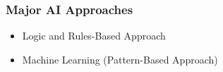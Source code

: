 



\begin{frame}[fragile]\frametitle{Major AI Approaches}
\begin{itemize}
\item  Logic and Rules-Based Approach
\item  Machine Learning (Pattern-Based Approach)
\end{itemize}
\end{frame}

